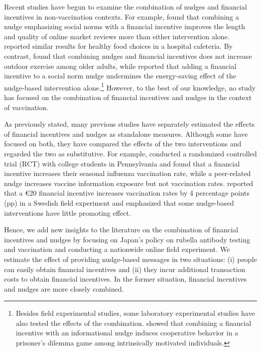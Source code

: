 \documentclass[
      12pt,
    a4paper
]{article}
\begin{document}
Recent studies have begun to examine the combination of nudges and financial incentives in non-vaccination contexts. For example, \citet{Burtch2018} found that combining a nudge emphasizing social norms with a financial incentive improves the length and quality of online market reviews more than either intervention alone. \citet{Thorndike2016} reported similar results for healthy food choices in a hospital cafeteria. By contrast, \citet{Kullgren2014} found that combining nudges and financial incentives does not increase outdoor exercise among older adults, while \citet{Pellerano2017} reported that adding a financial incentive to a social norm nudge undermines the energy-saving effect of the nudge-based intervention alone.\footnote{Besides field experimental studies, some laboratory experimental studies have also tested the effects of the combination. \citet{Chen2021} showed that combining a financial incentive with an informational nudge induces cooperative behavior in a prisoner's dilemma game among intrinsically motivated individuals.} However, to the best of our knowledge, no study has focused on the combination of financial incentives and nudges in the context of vaccination.

As previously stated, many previous studies have separately estimated the effects of financial incentives \citep{Banerjee2010, Barber2022, Barham2009, Brehm2022} and nudges \citep{Dai2021, Chapman2010, Milkman2021, Sasaki2022} as standalone measures. Although some have focused on both, they have compared the effects of the two interventions and regarded the two as substitutive. For example, \citet{Bronchetti2015} conducted a randomized controlled trial (RCT) with college students in Pennsylvania and found that a financial incentive increases their seasonal influenza vaccination rate, while a peer-related nudge increases vaccine information exposure but not vaccination rates. \citet{Campos-Mercade2021a} reported that a €20 financial incentive increases vaccination rates by 4 percentage points (pp) in a Swedish field experiment and emphasized that some nudge-based interventions have little promoting effect.

Hence, we add new insights to the literature on the combination of financial incentives and nudges by focusing on Japan's policy on rubella antibody testing and vaccination and conducting a nationwide online field experiment. We estimate the effect of providing nudge-based messages in two situations: (i) people can easily obtain financial incentives and (ii) they incur additional transaction costs to obtain financial incentives. In the former situation, financial incentives and nudges are more closely combined.
\end{document}
